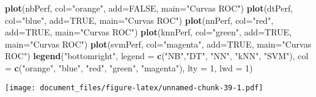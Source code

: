 \documentclass[]{article}
\newenvironment{Shaded}{\begin{snugshade}}{\end{snugshade}}
\newcommand{\DataTypeTok}[1]{\textcolor[rgb]{0.13,0.29,0.53}{#1}}
\newcommand{\DecValTok}[1]{\textcolor[rgb]{0.00,0.00,0.81}{#1}}
\newcommand{\KeywordTok}[1]{\textcolor[rgb]{0.13,0.29,0.53}{\textbf{#1}}}
\newcommand{\NormalTok}[1]{#1}
\newcommand{\OtherTok}[1]{\textcolor[rgb]{0.56,0.35,0.01}{#1}}
\newcommand{\StringTok}[1]{\textcolor[rgb]{0.31,0.60,0.02}{#1}}
\begin{document}
\begin{Shaded}
\begin{Highlighting}[]
\KeywordTok{plot}\NormalTok{(nbPerf, }\DataTypeTok{col=}\StringTok{"orange"}\NormalTok{, }\DataTypeTok{add=}\OtherTok{FALSE}\NormalTok{, }\DataTypeTok{main=}\StringTok{"Curvas ROC"}\NormalTok{)}
\KeywordTok{plot}\NormalTok{(dtPerf, }\DataTypeTok{col=}\StringTok{"blue"}\NormalTok{, }\DataTypeTok{add=}\OtherTok{TRUE}\NormalTok{, }\DataTypeTok{main=}\StringTok{"Curvas ROC"}\NormalTok{)}
\KeywordTok{plot}\NormalTok{(nnPerf, }\DataTypeTok{col=}\StringTok{"red"}\NormalTok{, }\DataTypeTok{add=}\OtherTok{TRUE}\NormalTok{, }\DataTypeTok{main=}\StringTok{"Curvas ROC"}\NormalTok{)}
\KeywordTok{plot}\NormalTok{(knnPerf, }\DataTypeTok{col=}\StringTok{"green"}\NormalTok{, }\DataTypeTok{add=}\OtherTok{TRUE}\NormalTok{, }\DataTypeTok{main=}\StringTok{"Curvas ROC"}\NormalTok{)}
\KeywordTok{plot}\NormalTok{(svmPerf, }\DataTypeTok{col=}\StringTok{"magenta"}\NormalTok{, }\DataTypeTok{add=}\OtherTok{TRUE}\NormalTok{, }\DataTypeTok{main=}\StringTok{"Curvas ROC"}\NormalTok{)}
\KeywordTok{legend}\NormalTok{(}\StringTok{"bottomright"}\NormalTok{, }\DataTypeTok{legend =} \KeywordTok{c}\NormalTok{(}\StringTok{"NB"}\NormalTok{,}\StringTok{"DT"}\NormalTok{, }\StringTok{"NN"}\NormalTok{, }\StringTok{"kNN"}\NormalTok{, }\StringTok{"SVM"}\NormalTok{), }
       \DataTypeTok{col =} \KeywordTok{c}\NormalTok{(}\StringTok{"orange"}\NormalTok{, }\StringTok{"blue"}\NormalTok{, }\StringTok{"red"}\NormalTok{, }\StringTok{"green"}\NormalTok{, }\StringTok{"magenta"}\NormalTok{), }
       \DataTypeTok{lty =} \DecValTok{1}\NormalTok{, }\DataTypeTok{lwd =} \DecValTok{1}\NormalTok{)}
\end{Highlighting}
\end{Shaded}

\texttt{[image: document\_files/figure-latex/unnamed-chunk-39-1.pdf]}
\end{document}
